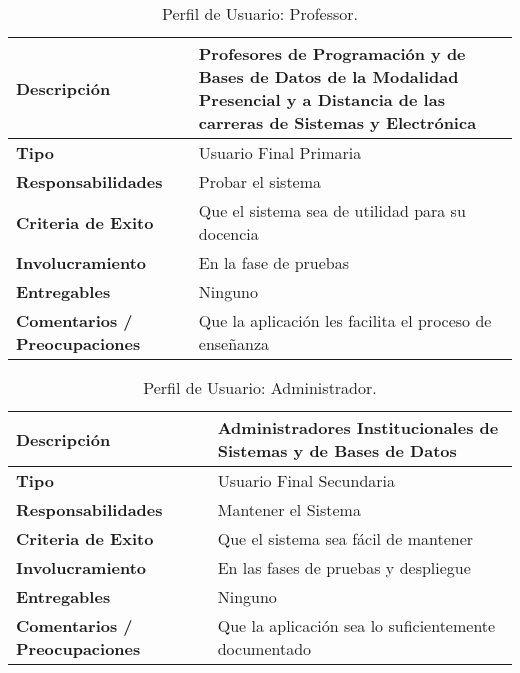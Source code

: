 \begin{table}[h!]
  \begin{tabular}{|p{}|p{}|}
    \hline
    \textbf{Descripción} & Profesores de Programación y de Bases de Datos de la Modalidad Presencial y a Distancia de las carreras de Sistemas y Electrónica \\
    \hline
    \textbf{Tipo} & Usuario Final Primaria \\
    \hline
    \textbf{Responsabilidades} & Probar el sistema \\
    \hline
    \textbf{Criteria de Exito} & Que el sistema sea de utilidad para su docencia \\
    \hline
    \textbf{Involucramiento} & En la fase de pruebas \\
    \hline
    \textbf{Entregables} & Ninguno \\
    \hline
    \textbf{Comentarios / Preocupaciones} & Que la aplicación les facilita el proceso de enseñanza \\
    \hline
  \end{tabular}
  \caption{Perfil de Usuario: Professor.}
  \label{per-user-prof}
\end{table}

\pagebreak

\begin{table}[h!]
  \begin{tabular}{|p{}|p{}|}
    \hline
    \textbf{Descripción} & Administradores Institucionales de Sistemas y de Bases de Datos \\
    \hline
    \textbf{Tipo} & Usuario Final Secundaria \\
    \hline
    \textbf{Responsabilidades} & Mantener el Sistema \\
    \hline
    \textbf{Criteria de Exito} & Que el sistema sea fácil de mantener \\
    \hline
    \textbf{Involucramiento} & En las fases de pruebas y despliegue \\
    \hline
    \textbf{Entregables} & Ninguno \\
    \hline
    \textbf{Comentarios / Preocupaciones} & Que la aplicación sea lo suficientemente documentado \\
    \hline
  \end{tabular}
  \caption{Perfil de Usuario: Administrador.}
  \label{per-user-admn}
\end{table}

